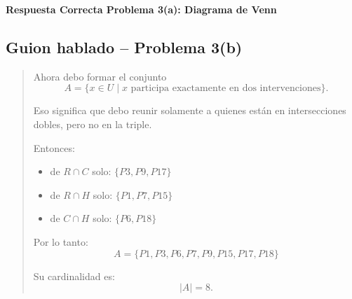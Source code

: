 \documentclass[12pt]{article}
\begin{document}
	\begin{center}
\end{center}
	
\textbf{Respuesta Correcta Problema 3(a): Diagrama de Venn}	
	
\newpage	

	\subsection*{Guion hablado -- Problema 3(b)}
	
	\begin{quote}
		Ahora debo formar el conjunto
		\[
		A=\{x\in U\mid x \text{ participa exactamente en dos intervenciones}\}.
		\]
		
		Eso significa que debo reunir solamente a quienes están en intersecciones dobles, pero no en la triple.
		
		Entonces:
		\begin{itemize}
			\item de \(R\cap C\) solo: \(\{P3,P9,P17\}\)
			\item de \(R\cap H\) solo: \(\{P1,P7,P15\}\)
			\item de \(C\cap H\) solo: \(\{P6,P18\}\)
		\end{itemize}
		
		Por lo tanto:
		\[
		A=\{P1,P3,P6,P7,P9,P15,P17,P18\}
		\]
		
		Su cardinalidad es:
		\[
		|A|=8.
		\]
	\end{quote}
	
\end{document}
